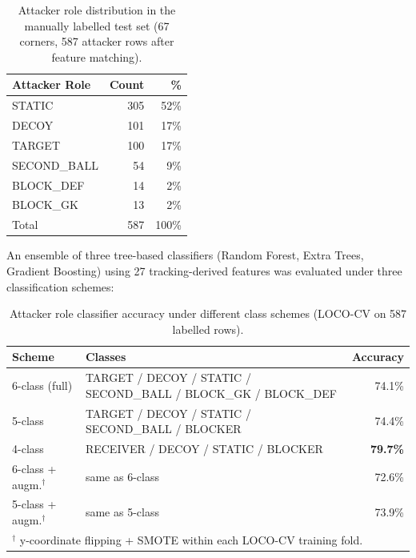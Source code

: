 \begin{table}[h]
  \centering
  \caption{Attacker role distribution in the manually labelled test set
           (67 corners, 587 attacker rows after feature matching).}
  \label{tab:sq2_role_dist}
  \begin{tabular}{lrr}
    \toprule
    \textbf{Attacker Role} & \textbf{Count} & \textbf{\%} \\
    \midrule
    STATIC      & 305 & 52\% \\
    DECOY       & 101 & 17\% \\
    TARGET      & 100 & 17\% \\
    SECOND\_BALL &  54 &  9\% \\
    BLOCK\_DEF  &  14 &  2\% \\
    BLOCK\_GK   &  13 &  2\% \\
    \midrule
    Total       & 587 & 100\% \\
    \bottomrule
  \end{tabular}
\end{table}

An ensemble of three tree-based classifiers (Random Forest, Extra
Trees, Gradient Boosting) using 27 tracking-derived features was
evaluated under three classification schemes:

\begin{table}[h]
  \centering
  \caption{Attacker role classifier accuracy under different class
           schemes (LOCO-CV on 587 labelled rows).}
  \label{tab:sq2_role_acc}
  \begin{tabular}{llr}
    \toprule
    \textbf{Scheme} & \textbf{Classes} & \textbf{Accuracy} \\
    \midrule
    6-class (full)                     & TARGET / DECOY / STATIC / SECOND\_BALL /
                                         BLOCK\_GK / BLOCK\_DEF & 74.1\% \\
    5-class                            & TARGET / DECOY / STATIC / SECOND\_BALL /
                                         BLOCKER                & 74.4\% \\
    4-class                            & RECEIVER / DECOY / STATIC / BLOCKER & \textbf{79.7\%} \\
    6-class + augm.$^{\dagger}$        & same as 6-class        & 72.6\% \\
    5-class + augm.$^{\dagger}$        & same as 5-class        & 73.9\% \\
    \bottomrule
    \multicolumn{3}{l}{\footnotesize $^{\dagger}$ y-coordinate flipping + SMOTE
      within each LOCO-CV training fold.}
  \end{tabular}
\end{table}

